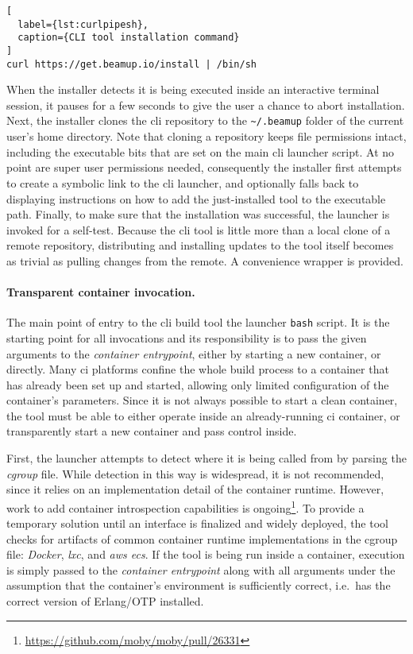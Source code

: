 \begin{lstlisting}[
  label={lst:curlpipesh},
  caption={CLI tool installation command}
]
curl https://get.beamup.io/install | /bin/sh
\end{lstlisting}

When the installer detects it is being executed inside an interactive terminal session, it pauses for a few seconds to give the user a chance to abort installation. Next, the installer clones the \acrshort{cli} repository to the \lstinline|~/.beamup| folder of the current user's home directory. Note that cloning a repository keeps file permissions intact, including the executable bits that are set on the main \acrshort{cli} launcher script. At no point are super user permissions needed, consequently the installer first attempts to create a symbolic link to the \acrshort{cli} launcher, and optionally falls back to displaying instructions on how to add the just-installed tool to the executable path. Finally, to make sure that the installation was successful, the launcher is invoked for a self-test. Because the \acrshort{cli} tool is little more than a local clone of a remote repository, distributing and installing updates to the tool itself becomes as trivial as pulling changes from the remote. A convenience wrapper is provided.

\paragraph{Transparent container invocation.} The main point of entry to the \acrshort{cli} build tool the launcher \lstinline|bash| script. It is the starting point for all invocations and its responsibility is to pass the given arguments to the \emph{container entrypoint}, either by starting a new container, or directly. Many \acrshort{ci} platforms confine the whole build process to a container that has already been set up and started, allowing only limited configuration of the container's parameters. Since it is not always possible to start a clean container, the tool must be able to either operate inside an already-running \acrshort{ci} container, or transparently start a new container and pass control inside.

First, the launcher  attempts to detect where it is being called from by parsing the \emph{\acrfull{cgroup}} file. While detection in this way is widespread, it is not recommended, since it relies on an implementation detail of the container runtime. However, work to add container introspection capabilities is ongoing\footnote{\url{https://github.com/moby/moby/pull/26331}}. To provide a temporary solution until an interface is finalized and widely deployed, the tool checks for artifacts of common container runtime implementations in the \acrshort{cgroup} file: \emph{Docker}, \emph{\acrfull{lxc}}, and \emph{\acrfull{aws} \acrfull{ecs}}. If the tool is being run inside a container, execution is simply passed to the \emph{container entrypoint} along with all arguments under the assumption that the container's environment is sufficiently correct, i.e.~has the correct version of Erlang/OTP installed.


